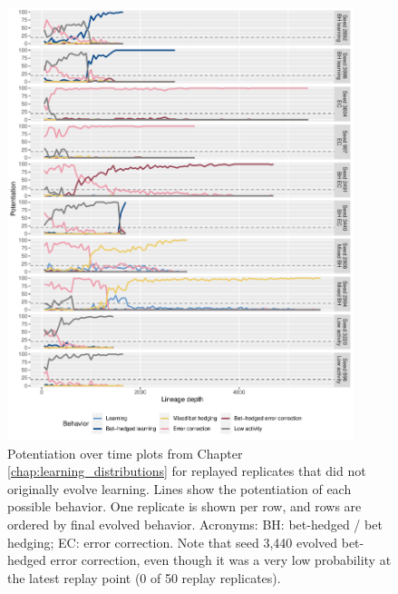 \begin{figure}[!h]
    \begin{center}
    \includegraphics[width=0.9\textwidth]{07_appendix_potentiation_over_time/media/non_learning.pdf}
    \caption{Potentiation over time plots from Chapter \ref{chap:learning_distributions} for replayed replicates that did not originally evolve learning.
    Lines show the potentiation of each possible behavior. 
    One replicate is shown per row, and rows are ordered by final evolved behavior.
    Acronyms: BH: bet-hedged / bet hedging; EC: error correction. 
    Note that seed 3,440 evolved bet-hedged error correction, even though it was a very low probability at the latest replay point (0 of 50 replay replicates). 
    }
    \label{fig:app_a_non_learning}
    \end{center}
\end{figure}